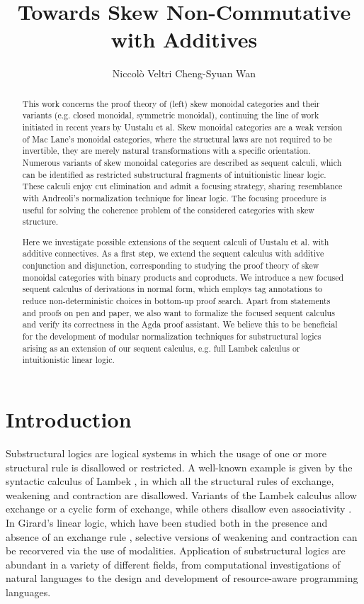 \documentclass[submission,copyright,creativecommons]{eptcs}
\title{Towards Skew Non-Commutative \MILL \text{ }with Additives}
\author{
Niccol{\`o} Veltri \qquad\qquad Cheng-Syuan Wan
\institute{Tallinn University of Technology, Estonia}
\email{\quad niccolo@cs.ioc.ee \quad\qquad cswan@cs.ioc.ee}
}
\theoremstyle{definition}
\begin{document}
\maketitle
\begin{abstract}
This work concerns the proof theory of (left) skew monoidal categories and their variants (e.g. closed monoidal, symmetric monoidal), continuing the line of work initiated in recent years by Uustalu et al.
Skew monoidal categories are a weak version of Mac Lane's monoidal categories, where the structural laws are not required to be invertible, they are merely natural transformations with a specific orientation. 
Numerous variants of skew monoidal categories are described as sequent calculi, which can be identified as restricted substructural fragments of intuitionistic linear logic. These calculi enjoy cut elimination and admit a focusing strategy, sharing resemblance with Andreoli's normalization technique for linear logic. The focusing procedure is useful for solving the coherence problem of the considered categories with skew structure.

Here we investigate possible extensions of the sequent calculi of Uustalu et al. with additive connectives. 
As a first step, we extend the sequent calculus with additive conjunction and disjunction, corresponding to studying the proof theory of skew monoidal categories with binary products and coproducts. 
We introduce a new focused sequent calculus of derivations in normal form, which employs tag annotations to reduce non-deterministic choices in bottom-up proof search.
Apart from statements and proofs on pen and paper, we also want to formalize the focused sequent calculus and verify its correctness in the Agda proof assistant.
We believe this to be beneficial for the development of modular normalization techniques for substructural logics arising as an extension of our sequent calculus, e.g. full Lambek calculus or intuitionistic linear logic.
\end{abstract}

\section{Introduction}

Substructural logics are logical systems in which the usage of one or more structural rule is disallowed or restricted. A well-known example is given by the syntactic calculus of Lambek \cite{lambek:mathematics:58}, in which all the structural rules of exchange, weakening and contraction are disallowed. Variants of the Lambek calculus allow exchange or a cyclic form of exchange, while others disallow even associativity \cite{moot:logic:12}. In Girard's linear logic, which have been studied both in the presence and absence of an exchange rule \cite{girard:linear:87,abrusci:noncommutative:1990}, selective versions of weakening and contraction can be recorvered via the use of modalities. Application of substructural logics are abundant in a variety of different fields, from computational investigations of natural languages to the design and development of resource-aware programming languages.
\end{document}
